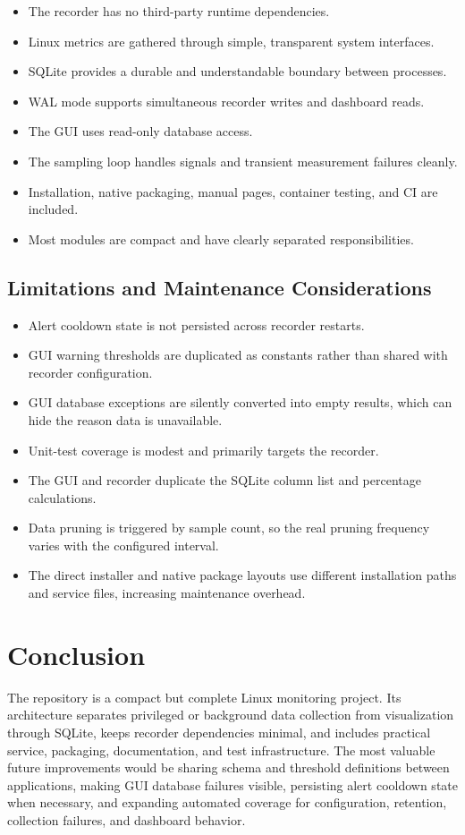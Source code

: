 \documentclass[11pt,a4paper]{article}
\begin{document}
\begin{itemize}
  \item The recorder has no third-party runtime dependencies.
  \item Linux metrics are gathered through simple, transparent system interfaces.
  \item SQLite provides a durable and understandable boundary between processes.
  \item WAL mode supports simultaneous recorder writes and dashboard reads.
  \item The GUI uses read-only database access.
  \item The sampling loop handles signals and transient measurement failures cleanly.
  \item Installation, native packaging, manual pages, container testing, and CI are included.
  \item Most modules are compact and have clearly separated responsibilities.
\end{itemize}

\subsection{Limitations and Maintenance Considerations}

\begin{itemize}
  \item Alert cooldown state is not persisted across recorder restarts.
  \item GUI warning thresholds are duplicated as constants rather than shared with recorder configuration.
  \item GUI database exceptions are silently converted into empty results, which can hide the reason data is unavailable.
  \item Unit-test coverage is modest and primarily targets the recorder.
  \item The GUI and recorder duplicate the SQLite column list and percentage calculations.
  \item Data pruning is triggered by sample count, so the real pruning frequency varies with the configured interval.
  \item The direct installer and native package layouts use different installation paths and service files, increasing maintenance overhead.
\end{itemize}

\section{Conclusion}

The repository is a compact but complete Linux monitoring project. Its architecture separates privileged or background data collection from visualization through SQLite, keeps recorder dependencies minimal, and includes practical service, packaging, documentation, and test infrastructure. The most valuable future improvements would be sharing schema and threshold definitions between applications, making GUI database failures visible, persisting alert cooldown state when necessary, and expanding automated coverage for configuration, retention, collection failures, and dashboard behavior.
\end{document}
